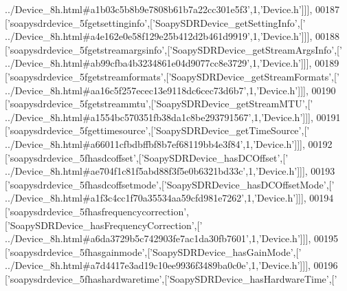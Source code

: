 \begin{DoxyCode}
{      ../Device\_8h.html#a1b03c5b8b9e7808b61b7a22cc301e5f3'},1,\textcolor{stringliteral}{'Device.h'}]]],
00187   [\textcolor{stringliteral}{'soapysdrdevice\_5fgetsettinginfo'},[\textcolor{stringliteral}{'SoapySDRDevice\_getSettingInfo'},[\textcolor{stringliteral}{'
      ../Device\_8h.html#a4e162e0e58f129e25b412d2b461d9919'},1,\textcolor{stringliteral}{'Device.h'}]]],
00188   [\textcolor{stringliteral}{'soapysdrdevice\_5fgetstreamargsinfo'},[\textcolor{stringliteral}{'SoapySDRDevice\_getStreamArgsInfo'},[\textcolor{stringliteral}{'
      ../Device\_8h.html#ab99cfba4b3234861e04d9077cc8e3729'},1,\textcolor{stringliteral}{'Device.h'}]]],
00189   [\textcolor{stringliteral}{'soapysdrdevice\_5fgetstreamformats'},[\textcolor{stringliteral}{'SoapySDRDevice\_getStreamFormats'},[\textcolor{stringliteral}{'
      ../Device\_8h.html#aa16c5f257ecec13e9118dc6cec73d6b7'},1,\textcolor{stringliteral}{'Device.h'}]]],
00190   [\textcolor{stringliteral}{'soapysdrdevice\_5fgetstreammtu'},[\textcolor{stringliteral}{'SoapySDRDevice\_getStreamMTU'},[\textcolor{stringliteral}{'
      ../Device\_8h.html#a1554bc570351fb38da1c8be293791567'},1,\textcolor{stringliteral}{'Device.h'}]]],
00191   [\textcolor{stringliteral}{'soapysdrdevice\_5fgettimesource'},[\textcolor{stringliteral}{'SoapySDRDevice\_getTimeSource'},[\textcolor{stringliteral}{'
      ../Device\_8h.html#a66011cfbdbffbf8b7ef68119bb4e3f84'},1,\textcolor{stringliteral}{'Device.h'}]]],
00192   [\textcolor{stringliteral}{'soapysdrdevice\_5fhasdcoffset'},[\textcolor{stringliteral}{'SoapySDRDevice\_hasDCOffset'},[\textcolor{stringliteral}{'
      ../Device\_8h.html#ae704f1c81f5abd88f3f5e0b6321bd33c'},1,\textcolor{stringliteral}{'Device.h'}]]],
00193   [\textcolor{stringliteral}{'soapysdrdevice\_5fhasdcoffsetmode'},[\textcolor{stringliteral}{'SoapySDRDevice\_hasDCOffsetMode'},[\textcolor{stringliteral}{'
      ../Device\_8h.html#a1f3c4cc1f70a35534aa59cfd981e7262'},1,\textcolor{stringliteral}{'Device.h'}]]],
00194   [\textcolor{stringliteral}{'soapysdrdevice\_5fhasfrequencycorrection'},[\textcolor{stringliteral}{'SoapySDRDevice\_hasFrequencyCorrection'},[\textcolor{stringliteral}{'
      ../Device\_8h.html#a6da3729b5c742903fe7ac1da30fb7601'},1,\textcolor{stringliteral}{'Device.h'}]]],
00195   [\textcolor{stringliteral}{'soapysdrdevice\_5fhasgainmode'},[\textcolor{stringliteral}{'SoapySDRDevice\_hasGainMode'},[\textcolor{stringliteral}{'
      ../Device\_8h.html#a7d4417e3ad19c10ee9936f3489ba0c0e'},1,\textcolor{stringliteral}{'Device.h'}]]],
00196   [\textcolor{stringliteral}{'soapysdrdevice\_5fhashardwaretime'},[\textcolor{stringliteral}{'SoapySDRDevice\_hasHardwareTime'},[\textcolor{stringliteral}{'
}
\end{DoxyCode}

